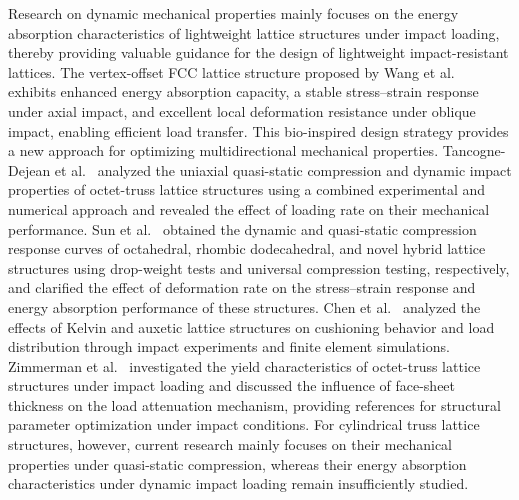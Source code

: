 \documentclass[12pt,a4paper]{article}
\numberwithin{equation}{section}
\begin{document}
	Research on dynamic mechanical properties mainly focuses on the energy absorption characteristics of lightweight lattice structures under impact loading, thereby providing valuable guidance for the design of lightweight impact-resistant lattices. The vertex-offset FCC lattice structure proposed by Wang et al.~\cite{Ref39} exhibits enhanced energy absorption capacity, a stable stress--strain response under axial impact, and excellent local deformation resistance under oblique impact, enabling efficient load transfer. This bio-inspired design strategy provides a new approach for optimizing multidirectional mechanical properties. Tancogne-Dejean et al.~\cite{Ref40} analyzed the uniaxial quasi-static compression and dynamic impact properties of octet-truss lattice structures using a combined experimental and numerical approach and revealed the effect of loading rate on their mechanical performance. Sun et al.~\cite{Ref41} obtained the dynamic and quasi-static compression response curves of octahedral, rhombic dodecahedral, and novel hybrid lattice structures using drop-weight tests and universal compression testing, respectively, and clarified the effect of deformation rate on the stress--strain response and energy absorption performance of these structures. Chen et al.~\cite{Ref42} analyzed the effects of Kelvin and auxetic lattice structures on cushioning behavior and load distribution through impact experiments and finite element simulations. Zimmerman et al.~\cite{Ref43} investigated the yield characteristics of octet-truss lattice structures under impact loading and discussed the influence of face-sheet thickness on the load attenuation mechanism, providing references for structural parameter optimization under impact conditions. For cylindrical truss lattice structures, however, current research mainly focuses on their mechanical properties under quasi-static compression, whereas their energy absorption characteristics under dynamic impact loading remain insufficiently studied.
	
\end{document}

